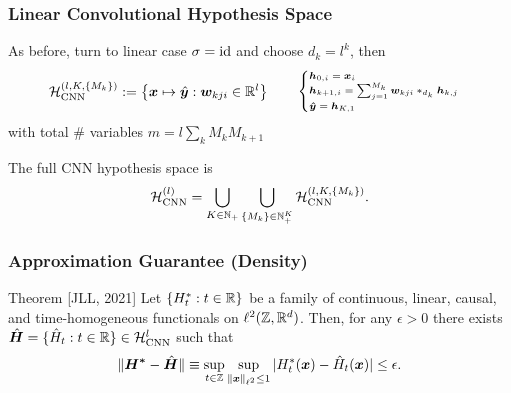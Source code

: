 \begin{frame}
	\frametitle{Linear Convolutional Hypothesis Space}

	As before, turn to linear case $\sigma = \mathrm{id}$ and choose $d_k = l^k$, then
	\begin{equation*}
		\begin{aligned}
			{{\mathcal H}}_{\text{CNN}}^{(l,K,\left\lbrace M_k \right\rbrace)}
			:=
			\left\{
				\bm x \mapsto \hat{\bm y}
				:
				\bm w_{kji} \in \mathbb{R}^l
			\right\}
		\end{aligned}
		\qquad
		\scriptsize
		\begin{cases}
			\bm h_{0,i} = \bm x_i\\
			\bm h_{k+1,i} = \sum_{j=1}^{M_k} {\bm w}_{kji} *_{d_k} \bm h_{k,j} \\
			\bm {\hat y} = \bm h_{K,1}
		\end{cases}
		\normalsize
	\end{equation*}
	with total \# variables $m = l \sum_{k} M_{k}M_{k+1}$

	The full CNN hypothesis space is
	\begin{equation*}
		{{\mathcal H}}_{\text{CNN}}^{(l)} =
		\bigcup_{K \in \mathbb N_+}
		\bigcup_{\left\lbrace M_k \right\rbrace \in \mathbb N_+^K}
		{{\mathcal H}}_{\text{CNN}}^{(l,K,\left\lbrace M_k \right\rbrace)}.
	\end{equation*}
\end{frame}

\begin{frame}[c]
	\frametitle{Approximation Guarantee (Density)}

	\begin{alertblock}{Theorem [JLL, 2021]}
		Let $\{ H^*_t : t\in\mathbb{R} \}$ be a family of continuous,
		linear, causal, and time-homogeneous functionals on $\ell^2(\mathbb{Z},\mathbb{R}^d)$.
		Then, for any $\epsilon > 0$ there exists
		$\hat{\bm H} = \{ \hat{H}_t : t\in \mathbb{R} \} \in {\mathcal H}_{\text{CNN}}^{\text{$l$}}$ such that
		\begin{equation*}
			\| \bm {H^*} - \hat{\bm H} \|
			\equiv
			\sup_{t\in\mathbb{Z}}
			\sup_{\| \boldsymbol{x} \|_{\ell^2} \leq 1}
			|
			H^*_t(\boldsymbol{x}) - \hat{H}_t(\boldsymbol{x})
			|
			\leq \epsilon.
		\end{equation*}
	\end{alertblock}


\end{frame}


